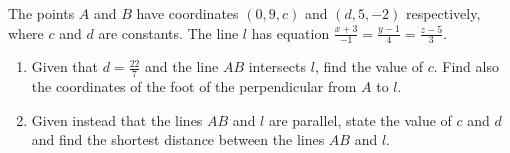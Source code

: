 \begin{problem}
    The points $A$ and $B$ have coordinates $(0, 9, c)$ and $(d, 5, -2)$ respectively, where $c$ and $d$ are constants. The line $l$ has equation $\frac{x+3}{-1} = \frac{y-1}4 = \frac{z-5}3$.

    \begin{enumerate}
        \item Given that $d = \frac{22}7$ and the line $AB$ intersects $l$, find the value of $c$. Find also the coordinates of the foot of the perpendicular from $A$ to $l$.
        \item Given instead that the lines $AB$ and $l$ are parallel, state the value of $c$ and $d$ and find the shortest distance between the lines $AB$ and $l$.
    \end{enumerate}
\end{problem}
